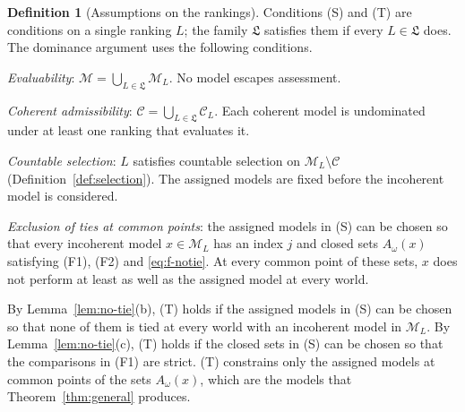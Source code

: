 \documentclass[11pt]{article}
\theoremstyle{definition}
\newtheorem{definition}[theorem]{Definition}
\theoremstyle{remark}
\newcommand{\M}{\mathcal M}
\newcommand{\C}{\mathcal C}
\newcommand{\Lf}{\mathfrak L}
\begin{document}
\begin{definition}[Assumptions on the rankings]\label{def:argument-assumptions}
{Conditions (S) and (T)} are conditions on a single ranking $L$; the family $\Lf$ satisfies them if every $L\in\Lf$ does. The dominance argument uses the following conditions.
\begin{itemize}[leftmargin=3.4em,labelsep=0.5em]
\item[\textbf{(E)}] \emph{Evaluability}: $\M=\bigcup_{L\in\Lf}\M_L$. No model escapes assessment.
\item[\textbf{(A)}] \emph{Coherent admissibility}: $\C=\bigcup_{L\in\Lf}\C_L$. Each coherent model is undominated under at least one ranking that evaluates it.
\item[\textbf{{(S)}}] \emph{Countable selection}: $L$ satisfies countable selection on $\M_L\setminus\C$ (Definition~\ref{def:selection}). {The assigned models} are fixed before the incoherent model is considered.
{\item[\textbf{(T)}] \emph{Exclusion of ties at common points}: the assigned models in (S) can be chosen so that every incoherent model $x\in\M_L$ has an index $j$ and closed sets $A_\omega(x)$ satisfying (F1), (F2) and \eqref{eq:f-notie}. At every common point of these sets, $x$ does not perform at least as well as the assigned model at every world.}
\end{itemize}
{By Lemma~\ref{lem:no-tie}(b), (T) holds if the assigned models in (S) can be chosen so that none of them is tied at every world with an incoherent model in $\M_L$. By Lemma~\ref{lem:no-tie}(c), (T) holds if the closed sets in (S) can be chosen so that the comparisons in (F1) are strict. (T) constrains only the assigned models at common points of the sets $A_\omega(x)$, which are the models that Theorem~\ref{thm:general} produces.}
\end{definition}
\end{document}
